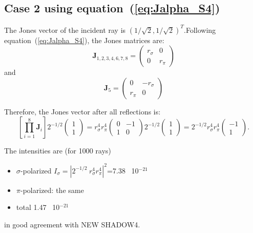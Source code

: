 \documentclass{iucr}
\begin{document}
\subsection{Case 2 using equation~(\ref{eq:Jalpha_S4})}
The Jones vector of the incident ray is $(1/\sqrt{2},1/\sqrt{2})^T$.Following equation~(\ref{eq:Jalpha_S4}), the Jones matrices are: 
\begin{equation}\label{eq:Jcase2_S4}
\textbf{J}_{1,2,3,4,6,7,8}=
    \begin{pmatrix}
r_\sigma & 0\\
0& 
r_\pi
\end{pmatrix}
\end{equation}
and
\begin{equation}\label{eq:J5case2_S4}
\textbf{J}_{5}=
\begin{pmatrix}
0 & -r_\sigma\\
r_\pi& 0
\end{pmatrix}
\end{equation}

Therefore, the Jones vector after all reflections is:
\begin{equation}\label{eq:JVcase2_S4}
\left[ \prod_{i=1}^{8} \textbf{J}_i \right]
    2^{-1/2}
    \begin{pmatrix}
    1\\1
    \end{pmatrix}=
    r_\sigma^4 r_\pi^4
        \begin{pmatrix}
    0&-1\\
    1 & 0
    \end{pmatrix}
    2^{-1/2}
        \begin{pmatrix}
    1\\1
    \end{pmatrix}
    =
    2^{-1/2}r_\sigma^4 r_\pi^4
    \begin{pmatrix}
    -1\\
    1
    \end{pmatrix}.
\end{equation}

The intensities are (for 1000 rays)
\begin{itemize}
    \item $\sigma$-polarized $I_\sigma=|2^{-1/2}~r_\sigma^4 r_\pi^4|^2$=7.38~ 10$^{-21}$
    \item $\pi$-polarized: the same 
    \item total 1.47~ 10$^{-21}$
\end{itemize}
in good agreement with NEW SHADOW4.
\end{document}
